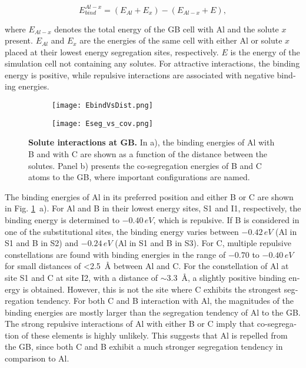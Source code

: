 \documentclass[12pt,a4paper,twoside,twocolumn,english,english]{article}
\begin{document}
\begin{otherlanguage}{english}
\begin{equation}
E_{bind}^{Al-x} = \left(E_{Al} + E_{x}\right) - \left(E_{Al-x} + E\right),
    \label{eq:ebind}
\end{equation}

where $E_{Al-x}$ denotes the total energy of the GB cell with Al and the solute $x$ present. $E_{Al}$ and $E_{x}$ are the energies of the same cell with either Al or solute $x$ placed at their lowest energy segregation sites, respectively. $E$ is the energy of the simulation cell not containing any solutes. For attractive interactions, the binding energy is positive, while repulsive interactions are associated with negative binding energies. 

\begin{figure}[htbp]
\begin{subfigure}[c]{1.0\linewidth}
\texttt{[image: EbindVsDist.png]}
\caption{}
\end{subfigure}
\begin{subfigure}[c]{1.0\linewidth}
\texttt{[image: Eseg\_vs\_cov.png]}
\caption{}
\end{subfigure}
\caption{\textbf{Solute interactions at GB.} In a), the binding energies of Al with B and with C are shown as a function of the distance between the solutes. Panel b) presents the co-segregation energies of B and C atoms to the GB, where important configurations are named.}
\label{fig:gbsegcov}
\end{figure}

The binding energies of Al in its preferred position and either B or C are shown in Fig. \ref{fig:gbsegcov}~a). For Al and B in their lowest energy sites, S1 and I1, respectively, the binding energy is determined to $-0.40\,\unit{eV}$, which is repulsive. If B is considered in one of the substitutional sites, the binding energy varies between $-0.42\,\unit{eV}$ (Al in S1 and B in S2) and $-0.24\,\unit{eV}$ (Al in S1 and B in S3). For C, multiple repulsive constellations are found with binding energies in the range of $-0.70$ to $-0.40\,\unit{eV}$ for small distances of <2.5~\AA{} between Al and C. For the constellation of Al at site S1 and C at site I2, with a distance of $\sim$3.3~\AA{}, a slightly positive binding energy is obtained. However, this is not the site where C exhibits the strongest segregation tendency. For both C and B interaction with Al, the magnitudes of the binding energies are mostly larger than the segregation tendency of Al to the GB. The strong repulsive interactions of Al with either B or C imply that co-segregation of these elements is highly unlikely. This suggests that Al is repelled from the GB, since both C and B exhibit a much stronger segregation tendency in comparison to Al.


\end{otherlanguage}
\end{document}
